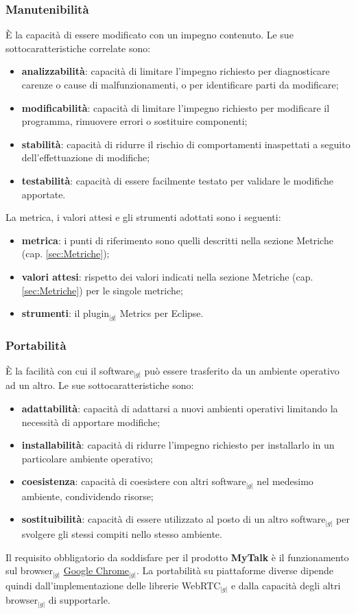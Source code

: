 {	\subsubsection{Manutenibilità}{
	    \`E la capacità di essere modificato con un impegno contenuto. Le sue sottocaratteristiche correlate sono:
	     \begin{itemize}
		\item \textbf{analizzabilità}: capacità di limitare l’impegno richiesto per diagnosticare carenze o cause di malfunzionamenti, o 
		      per identificare parti da modificare;
		\item \textbf{modificabilità}: capacità di limitare l’impegno richiesto per modificare il programma, rimuovere errori o sostituire componenti;
		\item \textbf{stabilità}: capacità di ridurre il rischio di comportamenti inaspettati a seguito dell’effettuazione di modifiche;
		\item \textbf{testabilità}: capacità di essere facilmente testato per validare le modifiche apportate.\\
	     \end{itemize}
	     La metrica, i valori attesi e gli strumenti adottati sono i seguenti:
	     \begin{itemize}
		\item \textbf{metrica}: i punti di riferimento sono quelli descritti nella sezione Metriche (cap. \ref{sec:Metriche});
		\item \textbf{valori attesi}: rispetto dei valori indicati nella sezione Metriche (cap. \ref{sec:Metriche}) per le singole metriche;
		\item \textbf{strumenti}: il plugin$_{|g|}$ Metrics per Eclipse.
	     \end{itemize}
	}

	\subsubsection{Portabilità}{
	     \`E la facilità con cui il software$_{|g|}$ può essere trasferito da un ambiente operativo ad un altro. Le sue sottocaratteristiche sono:
	     \begin{itemize}
		\item \textbf{adattabilità}: capacità di adattarsi a nuovi ambienti operativi limitando la necessità di apportare modifiche;
		\item \textbf{installabilità}: capacità di ridurre l’impegno richiesto per installarlo in un particolare ambiente operativo;
		\item \textbf{coesistenza}: capacità di coesistere con altri software$_{|g|}$ nel medesimo ambiente, condividendo risorse;
		\item \textbf{sostituibilità}: capacità di essere utilizzato al posto di un altro software$_{|g|}$ per svolgere gli stessi compiti nello stesso ambiente.\\
	     \end{itemize}
	     Il requisito obbligatorio da soddisfare per il prodotto \textbf{MyTalk} è il funzionamento sul browser$_{|g|}$ \underline{Google Chrome}$_{|g|}$.
	     La portabilità su piattaforme diverse dipende quindi dall'implementazione delle librerie WebRTC$_{|g|}$ e dalla capacità degli altri browser$_{|g|}$
	     di supportarle.
	}
}